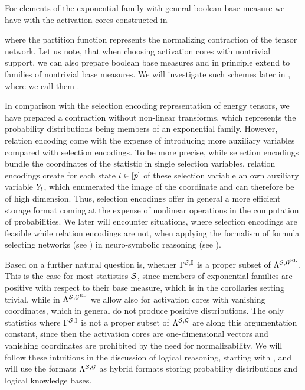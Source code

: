 For elements of the exponential family with general boolean base measure we have with the activation cores constructed in 
\begin{center}
    
\end{center}
where the partition function represents the normalizing contraction of the tensor network.
Let us note, that when choosing activation cores with nontrivial support, we can also prepare boolean base measures and in principle extend  to families of nontrivial base measures.
We will investigate such schemes later in , where we call them \HybridLogicNetworks{}.

In comparison with the selection encoding representation of energy tensors, we have prepared a contraction without non-linear transforms, which represents the probability distributions being members of an exponential family.
However, relation encoding come with the expense of introducing more auxiliary variables compared with selection encodings.
To be more precise, while selection encodings bundle the coordinates of the statistic in single selection variables, relation encodings create for each state $l\in[p]$ of these selection variable an own auxiliary variable $Y_{l}$, which enumerated the image of the coordinate and can therefore be of high dimension.
Thus, selection encodings offer in general a more efficient storage format coming at the expense of nonlinear operations in the computation of probabilities.
We later will encounter situations, where selection encodings are feasible while relation encodings are not, when applying the formalism of formula selecting networks (see ) in neuro-symbolic reasoning (see ).


Based on  a further natural question is, whether $\Gamma^{\mathcal{S},\mathbb{I}}$ is a proper subset of $\Lambda^{\mathcal{S},\mathcal{G}^{\mathrm{EL}}}$.
This is the case for most statistics $\mathcal{S}$, since members of exponential families are positive with respect to their base measure, which is in the corollaries setting trivial, while in $\Lambda^{\mathcal{S},\mathcal{G}^{\mathrm{EL}}}$ we allow also for activation cores with vanishing coordinates, which in general do not produce positive distributions.
The only statistics where $\Gamma^{\mathcal{S},\mathbb{I}}$ is not a proper subset of $\Lambda^{\mathcal{S},\mathcal{G}}$ are along this argumentation constant, since then the activation cores are one-dimensional vectors and vanishing coordinates are prohibited by the need for normalizability.
We will follow these intuitions in the discussion of logical reasoning, starting with , and will use the formats $\Lambda^{\mathcal{S},\mathcal{G}}$ as hybrid formats storing probability distributions and logical knowledge bases.

